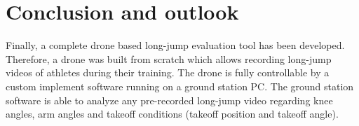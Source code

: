 \graphicspath{{./figures/}}
\chapter{Conclusion and outlook}
Finally, a complete drone based long-jump evaluation tool has been developed.
Therefore, a drone was built from scratch which allows recording long-jump
videos of athletes during their training.
The drone is fully controllable by a custom implement software running on a
ground station PC.
The ground station software is able to analyze any pre-recorded long-jump
video regarding knee angles, arm angles and takeoff conditions (takeoff
position and takeoff angle).